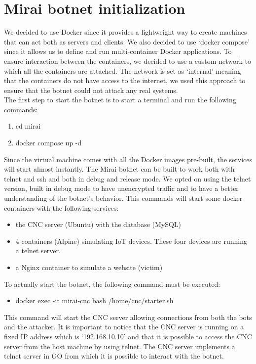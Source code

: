 \section{Mirai botnet initialization}
We decided to use Docker since it provides a lightweight way to create machines that can act both as servers and clients. We also decided to use `docker compose' since it allows us to define and run multi-container Docker applications. To ensure interaction between the containers, we decided to use a custom network to which all the containers are attached. The network is set as `internal' meaning that the containers do not have access to the internet, we used this approach to ensure that the botnet could not attack any real systems. \\
The first step to start the botnet is to start a terminal and run the following commands:
\begin{enumerate}
    \item cd mirai
    \item docker compose up -d
\end{enumerate}
Since the virtual machine comes with all the Docker images pre-built, the services will start almost instantly. The Mirai botnet can be built to work both with telnet and ssh and both in debug and release mode. We opted on using the telnet version, built in debug mode to have unencrypted traffic and to have a better understanding of the botnet's behavior.
This commands will start some docker containers with the following services:
\begin{itemize}
    \item the CNC server (Ubuntu) with the database (MySQL)
    \item 4 containers (Alpine) simulating IoT devices. These four devices are running a telnet server.
    \item a Nginx container to simulate a website (victim)
\end{itemize}
To actually start the botnet, the following command must be executed:
\begin{itemize}
    \item docker exec -it mirai-cnc bash /home/cnc/starter.sh
\end{itemize}
This command will start the CNC server allowing connections from both the bots and the attacker. It is important to notice that the CNC server is running on a fixed IP address which is `192.168.10.10' and that it is possible to access the CNC server from the host machine by using telnet. The CNC server implements a telnet server in GO from which it is possible to interact with the botnet.

